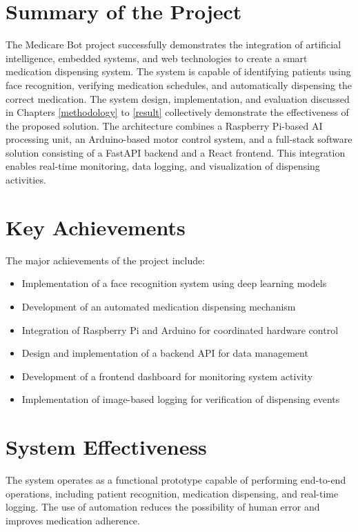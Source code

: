 

\section{Summary of the Project}

The Medicare Bot project successfully demonstrates the integration of artificial intelligence, embedded systems, and web technologies to create a smart medication dispensing system. The system is capable of identifying patients using face recognition, verifying medication schedules, and automatically dispensing the correct medication.
The system design, implementation, and evaluation discussed in Chapters \ref{methodology} to \ref{result} collectively demonstrate the effectiveness of the proposed solution.
The architecture combines a Raspberry Pi-based AI processing unit, an Arduino-based motor control system, and a full-stack software solution consisting of a FastAPI backend and a React frontend. This integration enables real-time monitoring, data logging, and visualization of dispensing activities.

\section{Key Achievements}

The major achievements of the project include:

\begin{itemize}
    \item Implementation of a face recognition system using deep learning models
    \item Development of an automated medication dispensing mechanism
    \item Integration of Raspberry Pi and Arduino for coordinated hardware control
    \item Design and implementation of a backend API for data management
    \item Development of a frontend dashboard for monitoring system activity
    \item Implementation of image-based logging for verification of dispensing events
\end{itemize}

\section{System Effectiveness}

The system operates as a functional prototype capable of performing end-to-end operations, including patient recognition, medication dispensing, and real-time logging. The use of automation reduces the possibility of human error and improves medication adherence.

